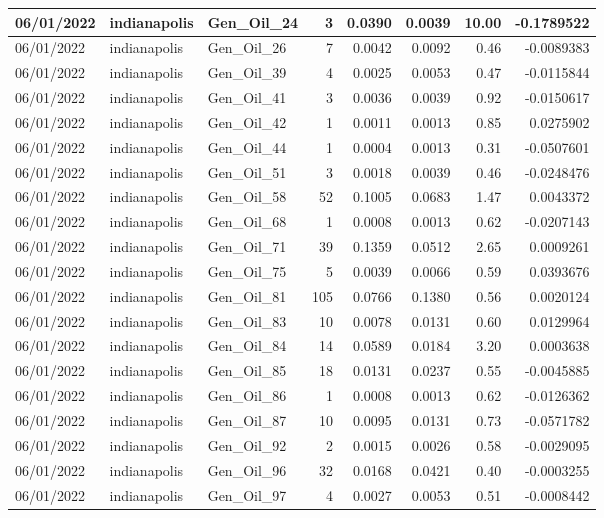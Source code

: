 \documentclass[
  letterpaper,
  DIV=11,
  numbers=noendperiod]{scrartcl}
\begin{document}
\begin{tabular}{l|l|l|r|r|r|r|r}
\hline
06/01/2022 & indianapolis & Gen\_Oil\_24 & 3 & 0.0390 & 0.0039 & 10.00 & -0.1789522\\
\hline
06/01/2022 & indianapolis & Gen\_Oil\_26 & 7 & 0.0042 & 0.0092 & 0.46 & -0.0089383\\
\hline
06/01/2022 & indianapolis & Gen\_Oil\_39 & 4 & 0.0025 & 0.0053 & 0.47 & -0.0115844\\
\hline
06/01/2022 & indianapolis & Gen\_Oil\_41 & 3 & 0.0036 & 0.0039 & 0.92 & -0.0150617\\
\hline
06/01/2022 & indianapolis & Gen\_Oil\_42 & 1 & 0.0011 & 0.0013 & 0.85 & 0.0275902\\
\hline
06/01/2022 & indianapolis & Gen\_Oil\_44 & 1 & 0.0004 & 0.0013 & 0.31 & -0.0507601\\
\hline
06/01/2022 & indianapolis & Gen\_Oil\_51 & 3 & 0.0018 & 0.0039 & 0.46 & -0.0248476\\
\hline
06/01/2022 & indianapolis & Gen\_Oil\_58 & 52 & 0.1005 & 0.0683 & 1.47 & 0.0043372\\
\hline
06/01/2022 & indianapolis & Gen\_Oil\_68 & 1 & 0.0008 & 0.0013 & 0.62 & -0.0207143\\
\hline
06/01/2022 & indianapolis & Gen\_Oil\_71 & 39 & 0.1359 & 0.0512 & 2.65 & 0.0009261\\
\hline
06/01/2022 & indianapolis & Gen\_Oil\_75 & 5 & 0.0039 & 0.0066 & 0.59 & 0.0393676\\
\hline
06/01/2022 & indianapolis & Gen\_Oil\_81 & 105 & 0.0766 & 0.1380 & 0.56 & 0.0020124\\
\hline
06/01/2022 & indianapolis & Gen\_Oil\_83 & 10 & 0.0078 & 0.0131 & 0.60 & 0.0129964\\
\hline
06/01/2022 & indianapolis & Gen\_Oil\_84 & 14 & 0.0589 & 0.0184 & 3.20 & 0.0003638\\
\hline
06/01/2022 & indianapolis & Gen\_Oil\_85 & 18 & 0.0131 & 0.0237 & 0.55 & -0.0045885\\
\hline
06/01/2022 & indianapolis & Gen\_Oil\_86 & 1 & 0.0008 & 0.0013 & 0.62 & -0.0126362\\
\hline
06/01/2022 & indianapolis & Gen\_Oil\_87 & 10 & 0.0095 & 0.0131 & 0.73 & -0.0571782\\
\hline
06/01/2022 & indianapolis & Gen\_Oil\_92 & 2 & 0.0015 & 0.0026 & 0.58 & -0.0029095\\
\hline
06/01/2022 & indianapolis & Gen\_Oil\_96 & 32 & 0.0168 & 0.0421 & 0.40 & -0.0003255\\
\hline
06/01/2022 & indianapolis & Gen\_Oil\_97 & 4 & 0.0027 & 0.0053 & 0.51 & -0.0008442\\

\end{tabular}
\end{document}
